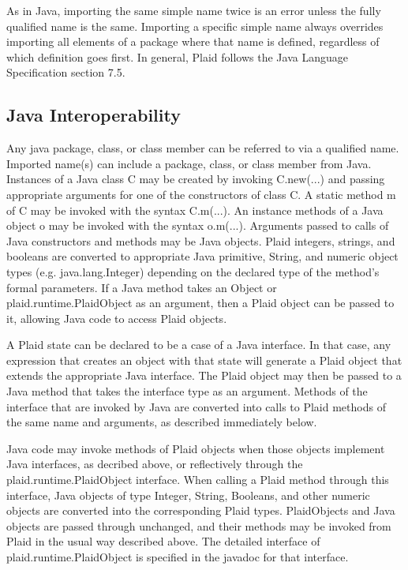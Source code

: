 As in Java, importing the same simple name twice is an error unless
the fully qualified name is the same.  Importing a specific simple
name always overrides importing all elements of a package where
that name is defined, regardless of which definition goes first.
In general, Plaid follows the Java Language Specification section
7.5.


\subsection{Java Interoperability}

  Any java package, class, or
class member can be referred to via a qualified name.  Imported
name(s) can include a package, class, or class member from Java.
Instances of a Java class C may be created by invoking C.new(...)  and
passing appropriate arguments for one of the constructors of class C.
A static method m of C may be invoked with the syntax C.m(...).  An
instance methods of a Java object o may be invoked with the syntax
o.m(...).  Arguments passed to calls of Java constructors and methods
may be Java objects.  Plaid integers, strings, and booleans are
converted to appropriate Java primitive, String, and numeric object
types (e.g. java.lang.Integer) depending on the declared type of the
method's formal parameters.  If a Java method takes an Object or
plaid.runtime.PlaidObject as an argument, then a Plaid object can be
passed to it, allowing Java code to access Plaid objects.

  A Plaid state can be declared to
be a case of a Java interface.  In that case, any 
expression that creates an object with that state will generate a
Plaid object that extends the appropriate Java interface.  The Plaid
object may then be passed to a Java method that takes the interface
type as an argument.  Methods of the interface that are invoked by
Java are converted into calls to Plaid methods of the same name and
arguments, as described immediately below.

  Java code may invoke methods of
Plaid objects when those objects implement Java interfaces, as
decribed above, or reflectively through the plaid.runtime.PlaidObject
interface.  When calling a Plaid method through this interface, Java
objects of type Integer, String, Booleans, and other numeric objects
are converted into the corresponding Plaid types.  PlaidObjects and
Java objects are passed through unchanged, and their methods may be
invoked from Plaid in the usual way described above.  The detailed
interface of plaid.runtime.PlaidObject is specified in the javadoc
for that interface.


